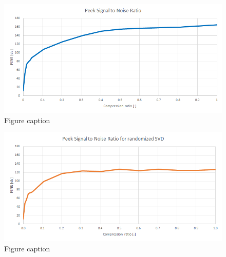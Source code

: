 \begin{figure}[ht]
\centering\includegraphics[width=\textwidth]{figures/temelin_PSNR}
\caption{Figure caption}
\end{figure}

\begin{figure}[ht]
\centering\includegraphics[width=\textwidth]{figures/temelin_PSNR_rand}
\caption{Figure caption}
\end{figure}



